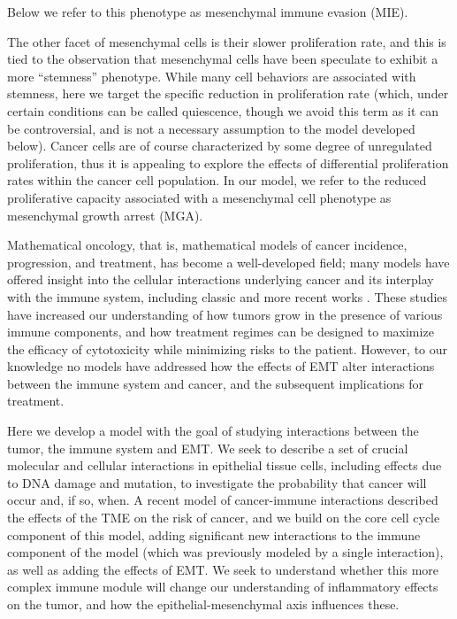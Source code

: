 \documentclass[11pt]{article}
\newcommand{\tcr} { \textcolor{red} }
\begin{document}
Below we refer to this phenotype as mesenchymal immune evasion (MIE).
\par
The other facet of mesenchymal cells is their slower proliferation rate, and this is tied to the observation that mesenchymal cells have been speculate to exhibit a more ``stemness'' phenotype.
While many cell behaviors are associated with stemness, here we target the specific reduction in proliferation rate \cite{woods2014effects} (which, under certain conditions can be called quiescence, though we avoid this term as it can be controversial, and is not a necessary assumption to the model developed below).
Cancer cells are of course characterized by some degree of unregulated proliferation, thus it is appealing to explore the effects of differential proliferation rates within the cancer cell population.
In our model, we refer to the reduced proliferative capacity associated with a mesenchymal cell phenotype as mesenchymal growth arrest (MGA).
\par
Mathematical oncology, that is, mathematical models of cancer incidence, progression, and treatment, has become a well-developed field; many models have offered insight into the cellular interactions underlying cancer and its interplay with the immune system, including classic \cite{anderson98_continuous, sherrattjonathana.92_oncogenes, pillis05_validated} and more recent works \cite{kim18_cell, gallaher14_bridging, gallaher18_spatial, an15_agentbased, serre16_mathematical, louzoun14_mathematical, briones-orta13_arkadia, lavi13_role, greene15_modeling, greene16_mathematical, cho17_modeling-1,  benzekry17_mathematical, owen11_mathematical, west18_multidrug}. These studies have increased our understanding of how tumors grow in the presence of various immune components, and how treatment regimes can be designed to maximize the efficacy of cytotoxicity while minimizing risks to the patient. However, to our knowledge no models have addressed how the effects of EMT alter interactions between the immune system and cancer, and the subsequent implications for treatment. 
\par
Here we develop a model with the goal of studying interactions between the tumor, the immune system and EMT. We seek to describe a set of crucial molecular and cellular interactions in epithelial tissue cells, including effects due to DNA damage and mutation, to investigate the probability that cancer will occur and, if so, when. A recent model of cancer-immune interactions \cite{guo17_multiscale} described the effects of the TME on the risk of cancer, and we build on the core cell cycle component of this model, adding significant new interactions to the immune component of the model (which was previously modeled by a single interaction), as well as adding the effects of EMT. We seek to understand whether this more complex immune module will change our understanding of inflammatory effects on the tumor, and how the epithelial-mesenchymal axis influences these.
\end{document}
